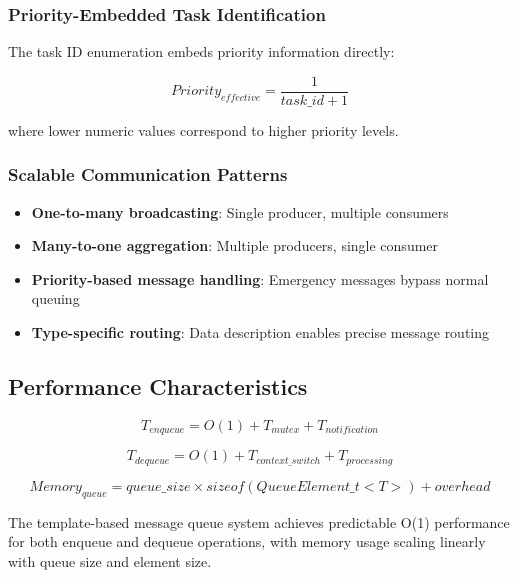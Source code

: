 \documentclass{article}
\begin{document}
\subsubsection{Priority-Embedded Task Identification}

The task ID enumeration embeds priority information directly:

\begin{equation}
Priority_{effective} = \frac{1}{task\_id + 1}
\end{equation}

where lower numeric values correspond to higher priority levels.

\subsubsection{Scalable Communication Patterns}

\begin{itemize}
    \item \textbf{One-to-many broadcasting}: Single producer, multiple consumers
    \item \textbf{Many-to-one aggregation}: Multiple producers, single consumer  
    \item \textbf{Priority-based message handling}: Emergency messages bypass normal queuing
    \item \textbf{Type-specific routing}: Data description enables precise message routing
\end{itemize}

\subsection{Performance Characteristics}

\begin{equation}
T_{enqueue} = O(1) + T_{mutex} + T_{notification}
\end{equation}

\begin{equation}
T_{dequeue} = O(1) + T_{context\_switch} + T_{processing}
\end{equation}

\begin{equation}
Memory_{queue} = queue\_size \times sizeof(QueueElement\_t<T>) + overhead
\end{equation}

The template-based message queue system achieves predictable O(1) performance for both enqueue and dequeue operations, with memory usage scaling linearly with queue size and element size.
\end{document}
